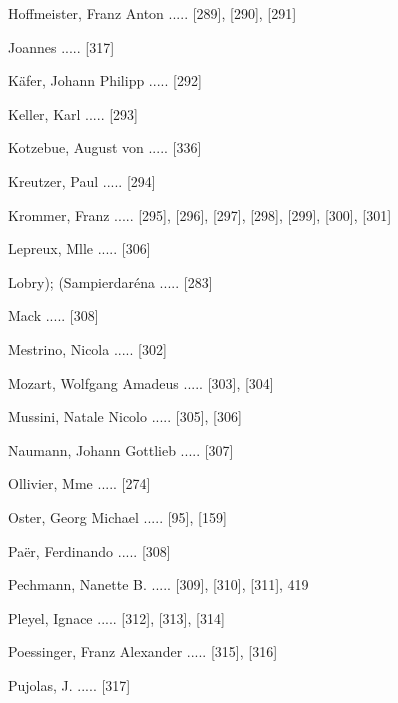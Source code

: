 \documentclass[twocolumn]{book}
\begin{document}
\newline 
Hoffmeister, Franz Anton ..... [289], [290], [291]

\newline 
Joannes ..... [317]

\newline 
Käfer, Johann Philipp ..... [292]

\newline 
Keller, Karl ..... [293]

\newline 
Kotzebue, August von ..... [336]

\newline 
Kreutzer, Paul ..... [294]

\newline 
Krommer, Franz ..... [295], [296], [297], [298], [299], [300], [301]

\newline 
Lepreux, Mlle ..... [306]

\newline 
Lobry); (Sampierdaréna ..... [283]

\newline 
Mack ..... [308]

\newline 
Mestrino, Nicola ..... [302]

\newline 
Mozart, Wolfgang Amadeus ..... [303], [304]

\newline 
Mussini, Natale Nicolo ..... [305], [306]

\newline 
Naumann, Johann Gottlieb ..... [307]

\newline 
Ollivier, Mme ..... [274]

\newline 
Oster, Georg Michael ..... [95], [159]

\newline 
Paër, Ferdinando ..... [308]

\newline 
Pechmann, Nanette B. ..... [309], [310], [311], 419

\newline 
Pleyel, Ignace ..... [312], [313], [314]

\newline 
Poessinger, Franz Alexander ..... [315], [316]

\newline 
Pujolas, J. ..... [317]
\end{document}

